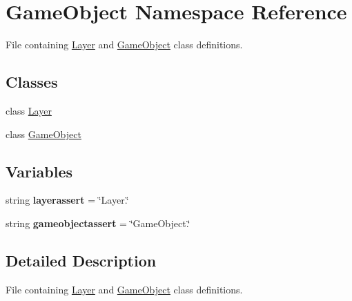 \hypertarget{namespaceGameObject}{\section{\-Game\-Object \-Namespace \-Reference}
\label{namespaceGameObject}
}


\-File containing \hyperlink{classGameObject_1_1Layer}{\-Layer} and \hyperlink{namespaceGameObject}{\-Game\-Object} class definitions.  


\subsection*{\-Classes}
\begin{DoxyCompactItemize}
\item 
class \hyperlink{classGameObject_1_1Layer}{\-Layer}
\item 
class \hyperlink{classGameObject_1_1GameObject}{\-Game\-Object}
\end{DoxyCompactItemize}
\subsection*{\-Variables}
\begin{DoxyCompactItemize}
\item 
\hypertarget{namespaceGameObject_a882b48dfb1cfe58bddbcab47f72509f0}{string {\bfseries layerassert} = \char`\"{}\-Layer.\char`\"{}}\label{namespaceGameObject_a882b48dfb1cfe58bddbcab47f72509f0}

\item 
\hypertarget{namespaceGameObject_aa7de38f4a13f622a77d0471dc95823a2}{string {\bfseries gameobjectassert} = \char`\"{}\-Game\-Object.\char`\"{}}\label{namespaceGameObject_aa7de38f4a13f622a77d0471dc95823a2}

\end{DoxyCompactItemize}


\subsection{\-Detailed \-Description}
\-File containing \hyperlink{classGameObject_1_1Layer}{\-Layer} and \hyperlink{namespaceGameObject}{\-Game\-Object} class definitions. 